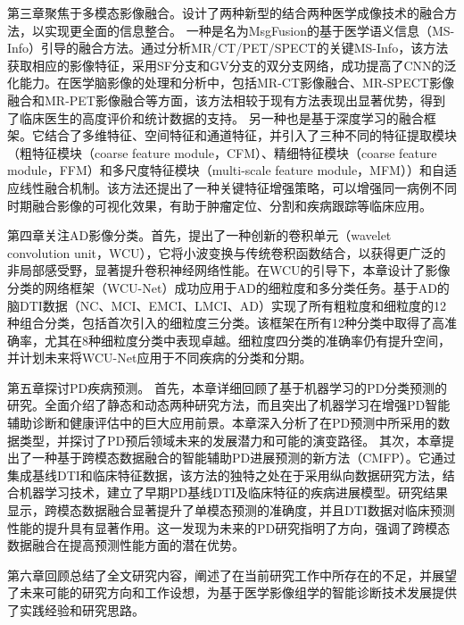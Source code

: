 第三章聚焦于多模态影像融合。设计了两种新型的结合两种医学成像技术的融合方法，以实现更全面的信息整合。
一种是名为MsgFusion的基于医学语义信息（MS-Info）引导的融合方法。通过分析MR/CT/PET/SPECT的关键MS-Info，该方法获取相应的影像特征，采用SF分支和GV分支的双分支网络，成功提高了CNN的泛化能力。在医学脑影像的处理和分析中，包括MR-CT影像融合、MR-SPECT影像融合和MR-PET影像融合等方面，该方法相较于现有方法表现出显著优势，得到了临床医生的高度评价和统计数据的支持。
另一种也是基于深度学习的融合框架。它结合了多维特征、空间特征和通道特征，并引入了三种不同的特征提取模块（粗特征模块（coarse feature module，CFM）、精细特征模块（coarse feature module，FFM）和多尺度特征模块（multi-scale feature module，MFM））和自适应线性融合机制。该方法还提出了一种关键特征增强策略，可以增强同一病例不同时期融合影像的可视化效果，有助于肿瘤定位、分割和疾病跟踪等临床应用。


第四章关注AD影像分类。首先，提出了一种创新的卷积单元（wavelet convolution unit，WCU），它将小波变换与传统卷积函数结合，以获得更广泛的非局部感受野，显著提升卷积神经网络性能。在WCU的引导下，本章设计了影像分类的网络框架（WCU-Net）成功应用于AD的细粒度和多分类任务。基于AD的脑DTI数据（NC、MCI、EMCI、LMCI、AD）实现了所有粗粒度和细粒度的12种组合分类，包括首次引入的细粒度三分类。该框架在所有12种分类中取得了高准确率，尤其在8种细粒度分类中表现卓越。细粒度四分类的准确率仍有提升空间，并计划未来将WCU-Net应用于不同疾病的分类和分期。


第五章探讨PD疾病预测。
首先，本章详细回顾了基于机器学习的PD分类预测的研究。全面介绍了静态和动态两种研究方法，而且突出了机器学习在增强PD智能辅助诊断和健康评估中的巨大应用前景。本章深入分析了在PD预测中所采用的数据类型，并探讨了PD预后领域未来的发展潜力和可能的演变路径。
其次，本章提出了一种基于跨模态数据融合的智能辅助PD进展预测的新方法（CMFP）。它通过集成基线DTI和临床特征数据，该方法的独特之处在于采用纵向数据研究方法，结合机器学习技术，建立了早期PD基线DTI及临床特征的疾病进展模型。研究结果显示，跨模态数据融合显著提升了单模态预测的准确度，并且DTI数据对临床预测性能的提升具有显著作用。这一发现为未来的PD研究指明了方向，强调了跨模态数据融合在提高预测性能方面的潜在优势。

第六章回顾总结了全文研究内容，阐述了在当前研究工作中所存在的不足，并展望了未来可能的研究方向和工作设想，为基于医学影像组学的智能诊断技术发展提供了实践经验和研究思路。

